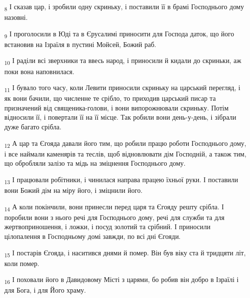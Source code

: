 \begin{tcolorbox}
\textsubscript{8} І сказав цар, і зробили одну скриньку, і поставили її в брамі Господнього дому назовні.
\end{tcolorbox}
\begin{tcolorbox}
\textsubscript{9} І проголосили в Юді та в Єрусалимі приносити для Господа даток, що його встановив на Ізраїля в пустині Мойсей, Божий раб.
\end{tcolorbox}
\begin{tcolorbox}
\textsubscript{10} І раділи всі зверхники та ввесь народ, і приносили й кидали до скриньки, аж поки вона наповнилася.
\end{tcolorbox}
\begin{tcolorbox}
\textsubscript{11} І бувало того часу, коли Левити приносили скриньку на царський перегляд, і як вони бачили, що численне те срібло, то приходив царський писар та призначений від священика-голови, і вони випорожнювали скриньку. Потім відносили її, і повертали її на її місце. Так робили вони день-у-день, і зібрали дуже багато срібла.
\end{tcolorbox}
\begin{tcolorbox}
\textsubscript{12} А цар та Єгояда давали його тим, що робили працю роботи Господнього дому, і все наймали каменярів та теслів, щоб відновлювати дім Господній, а також тим, що обробляли залізо та мідь на зміцнення Господнього дому.
\end{tcolorbox}
\begin{tcolorbox}
\textsubscript{13} І працювали робітники, і чинилася направа працею їхньої руки. І поставили вони Божий дім на міру його, і зміцнили його.
\end{tcolorbox}
\begin{tcolorbox}
\textsubscript{14} А коли покінчили, вони принесли перед царя та Єгояду решту срібла. І поробили вони з нього речі для Господнього дому, речі для служби та для жертвоприношення, і ложки, і посуд золотий та срібний. І приносили цілопалення в Господньому домі завжди, по всі дні Єгояди.
\end{tcolorbox}
\begin{tcolorbox}
\textsubscript{15} І постарів Єгояда, і наситився днями й помер. Він був віку ста й тридцяти літ, коли помер.
\end{tcolorbox}
\begin{tcolorbox}
\textsubscript{16} І поховали його в Давидовому Місті з царями, бо робив він добро в Ізраїлі і для Бога, і для Його храму.
\end{tcolorbox}
